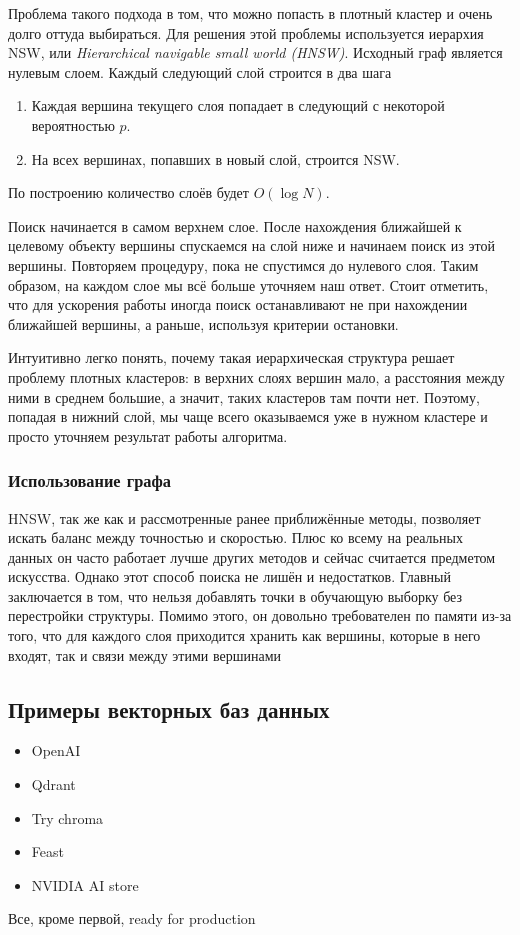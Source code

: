Проблема такого подхода в том, что можно попасть в плотный кластер и очень долго оттуда выбираться.
Для решения этой проблемы используется иерархия NSW, или \textit{Hierarchical navigable small world (HNSW)}.
Исходный граф является нулевым слоем.
Каждый следующий слой строится в два шага

\begin{enumerate}
    \item Каждая вершина текущего слоя попадает в следующий с некоторой вероятностью $p$.
    \item На всех вершинах, попавших в новый слой, строится NSW\@.
\end{enumerate}
По построению количество слоёв будет $O(\log N)$.

Поиск начинается в самом верхнем слое.
После нахождения ближайшей к целевому объекту вершины спускаемся на слой ниже и начинаем поиск из этой вершины.
Повторяем процедуру, пока не спустимся до нулевого слоя.
Таким образом, на каждом слое мы всё больше уточняем наш ответ.
Стоит отметить, что для ускорения работы иногда поиск останавливают не при нахождении ближайшей вершины, а раньше,
используя критерии остановки.

Интуитивно легко понять, почему такая иерархическая структура решает проблему плотных кластеров: в верхних слоях
вершин мало, а расстояния между ними в среднем большие, а значит, таких кластеров там почти нет.
Поэтому, попадая в нижний слой, мы чаще всего оказываемся уже в нужном кластере и просто уточняем результат работы
алгоритма.

\subsubsection{Использование графа}

HNSW, так же как и рассмотренные ранее приближённые методы, позволяет искать баланс между точностью и скоростью.
Плюс ко всему на реальных данных он часто работает лучше других методов и сейчас считается предметом искусства.
Однако этот способ поиска не лишён и недостатков.
Главный заключается в том, что нельзя добавлять точки в обучающую выборку без перестройки структуры.
Помимо этого, он довольно требователен по памяти из-за того, что для каждого слоя приходится хранить как вершины,
которые в него входят, так и связи между этими вершинами

\subsection{Примеры векторных баз данных}

\begin{itemize}
    \item OpenAI
    \item Qdrant
    \item Try chroma
    \item Feast
    \item NVIDIA AI store
\end{itemize}
Все, кроме первой, ready for production